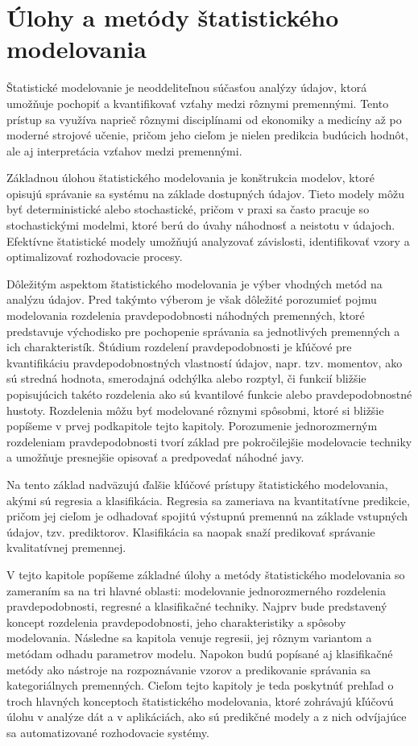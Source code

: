 \chapter{Úlohy a metódy štatistického modelovania}\label{sec:ulohy_metody}

Štatistické modelovanie je neoddeliteľnou súčasťou analýzy údajov, ktorá umožňuje pochopiť a kvantifikovať vzťahy medzi rôznymi premennými. Tento prístup sa využíva naprieč rôznymi disciplínami od ekonomiky a medicíny až po moderné strojové učenie, pričom jeho cieľom je nielen predikcia budúcich hodnôt, ale aj interpretácia vzťahov medzi premennými.

Základnou úlohou štatistického modelovania je konštrukcia modelov, ktoré opisujú správanie sa systému na základe dostupných údajov. Tieto modely môžu byť deterministické alebo stochastické, pričom v praxi sa často pracuje so stochastickými modelmi, ktoré berú do úvahy náhodnosť a neistotu v údajoch. Efektívne štatistické modely umožňujú analyzovať závislosti, identifikovať vzory a optimalizovať rozhodovacie procesy.

Dôležitým aspektom štatistického modelovania je výber vhodných metód na analýzu údajov. Pred takýmto výberom je však dôležité porozumieť pojmu modelovania rozdelenia pravdepodobnosti náhodných premenných, ktoré predstavuje východisko pre pochopenie správania sa jednotlivých premenných a ich charakteristík. Štúdium rozdelení pravdepodobnosti je kľúčové pre kvantifikáciu pravdepodobnostných vlastností údajov, napr. tzv. momentov, ako sú stredná hodnota, smerodajná odchýlka alebo rozptyl, či funkcií bližšie popisujúcich takéto rozdelenia ako sú kvantilové funkcie alebo pravdepodobnostné hustoty. Rozdelenia môžu byť modelované rôznymi spôsobmi, ktoré si bližšie popíšeme v prvej podkapitole tejto kapitoly. Porozumenie jednorozmerným rozdeleniam pravdepodobnosti tvorí základ pre pokročilejšie modelovacie techniky a umožňuje presnejšie opisovať a predpovedať náhodné javy.

Na tento základ nadväzujú ďalšie kľúčové prístupy štatistického modelovania, akými sú regresia a klasifikácia. Regresia sa zameriava na kvantitatívne predikcie, pričom jej cieľom je odhadovať spojitú výstupnú premennú na základe vstupných údajov, tzv. prediktorov. Klasifikácia sa naopak snaží predikovať správanie kvalitatívnej premennej.

V tejto kapitole popíšeme základné úlohy a metódy štatistického modelovania so zameraním sa na tri hlavné oblasti: modelovanie jednorozmerného rozdelenia pravdepodobnosti, regresné a klasifikačné techniky. Najprv bude predstavený koncept rozdelenia pravdepodobnosti, jeho charakteristiky a spôsoby modelovania. Následne sa kapitola venuje regresii, jej rôznym variantom a metódam odhadu parametrov modelu. Napokon budú popísané aj klasifikačné metódy ako nástroje na rozpoznávanie vzorov a predikovanie správania sa kategoriálnych premenných. Cieľom tejto kapitoly je teda poskytnúť prehľad o troch hlavných konceptoch štatistického modelovania, ktoré zohrávajú kľúčovú úlohu v analýze dát a v aplikáciách, ako sú predikčné modely a z nich odvíjajúce sa automatizované rozhodovacie systémy.

